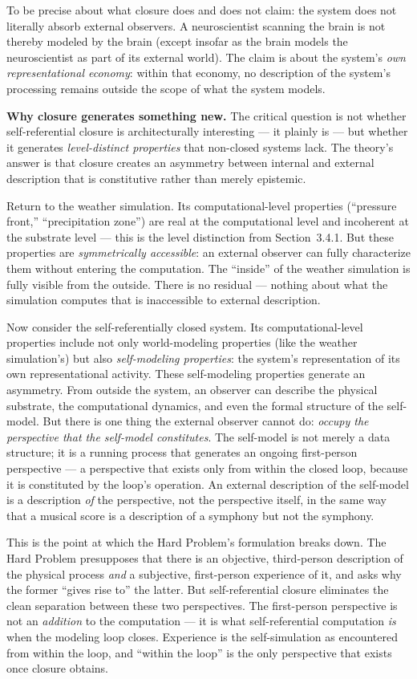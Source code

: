 \documentclass[12pt]{article}
\newcommand{\revend}{}
\begin{document}
{To be precise about what closure does and does not claim: the system does not literally absorb external observers. A neuroscientist scanning the brain is not thereby modeled by the brain (except insofar as the brain models the neuroscientist as part of its external world). The claim is about the system's \emph{own representational economy}: within that economy, no description of the system's processing remains outside the scope of what the system models.

\textbf{Why closure generates something new.} The critical question is not whether self-referential closure is architecturally interesting --- it plainly is --- but whether it generates \emph{level-distinct properties} that non-closed systems lack. The theory's answer is that closure creates an asymmetry between internal and external description that is constitutive rather than merely epistemic.

Return to the weather simulation. Its computational-level properties (``pressure front,'' ``precipitation zone'') are real at the computational level and incoherent at the substrate level --- this is the level distinction from Section~3.4.1. But these properties are \emph{symmetrically accessible}: an external observer can fully characterize them without entering the computation. The ``inside'' of the weather simulation is fully visible from the outside. There is no residual --- nothing about what the simulation computes that is inaccessible to external description.

Now consider the self-referentially closed system. Its computational-level properties include not only world-modeling properties (like the weather simulation's) but also \emph{self-modeling properties}: the system's representation of its own representational activity. These self-modeling properties generate an asymmetry. From outside the system, an observer can describe the physical substrate, the computational dynamics, and even the formal structure of the self-model. But there is one thing the external observer cannot do: \emph{occupy the perspective that the self-model constitutes}. The self-model is not merely a data structure; it is a running process that generates an ongoing first-person perspective --- a perspective that exists only from within the closed loop, because it is constituted by the loop's operation. An external description of the self-model is a description \emph{of} the perspective, not the perspective itself, in the same way that a musical score is a description of a symphony but not the symphony.

This is the point at which the Hard Problem's formulation breaks down. The Hard Problem presupposes that there is an objective, third-person description of the physical process \emph{and} a subjective, first-person experience of it, and asks why the former ``gives rise to'' the latter. But self-referential closure eliminates the clean separation between these two perspectives. The first-person perspective is not an \emph{addition} to the computation --- it is what self-referential computation \emph{is} when the modeling loop closes. Experience is the self-simulation as encountered from within the loop, and ``within the loop'' is the only perspective that exists once closure obtains.\revend}
\end{document}
